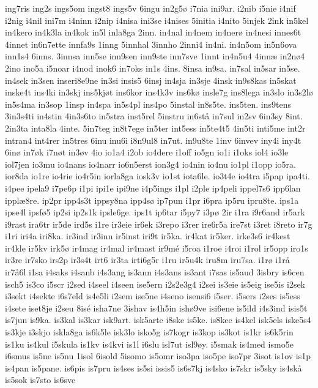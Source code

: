 {ing7ris
ing2s
ings5om
ingst8
ings5v
6ingu
in2g5ø
i7nia
ini9ar.
i2nib
i5nie
i4nif
i2nig
i4nil
ini7m
i4ninn
i2nip
i4nisa
ini3se
i4nises
5initia
i4nito
5injek
2ink
in5kel
in4kero
in4k3la
in4kok
in5l
inla8ga
2inn.
in4nal
in4nem
in4nerø
in4nesi
innes6t
4innet
in6n7ette
innfa9s
1inng
5innhal
3innho
2inni4
in4ni.
in4n5om
in5n6ova
inn1s4
6inns.
3innsa
inn5se
inn9sen
inn9ste
inn7sve
1innt
in4n5u4
4innæ
in2nø4
2ino
ino5a
i5noar
i4nod
inok6
in7oks
in1s
4ins.
8insa
in9sa.
in7sal
in5sar
in5se.
in4sek
in3sen
inseri8e9ne
in3si
insis5
6insj
in4sja
in3sje
4insk
in9s8kas
in5skat
inske4t
ins4ki
in3skj
ins5kjøt
ins6kor
ins4k3v
ins6kø
insle7g
ins8lega
in3slo
in3s2lø
in5s4ma
in3sop
1insp
in4spa
in5s4pl
ins4po
5instal
in8s5te.
ins5ten.
ins9tens
3in3s4ti
in4stin
4in3s6to
in5stra
inst5rel
5instru
in6stå
in7sul
in2sv
6in3sy
8int.
2in3ta
inta8la
4inte.
5in7teg
in8t7ege
in5ter
int5ess
in5te4t5
4in5ti
inti5me
int2r
intran4
int4rer
in5tres
6inu
inu6i
i8n9ul8
in7ut.
in9u8te
1inv
6invev
iny4i
iny4t
6inø
in7øk
i7nøt
in3øv
4io
io1a4
i2ob
io4dere
i1off
io5gn
io1i
i1oks
iol4
io3le
iol7jen
io3mu
io4nans
io4narr
io6n5erst
ion3g4
io4nin
io4nu
io1pl
i1opp
io5ra.
ior8da
io1re
io4rie
io4r5in
iorla8ga
iosk3v
io1st
iota6le.
io3t4e
io4tra
i5pap
ipa4ti.
i4pee
ipela9
i7pe6p
i1pi
ipi1e
ipi9ne
i4p5ings
i1pl
i2ple
ip4peli
ippel7s6
ipp6lan
ipplæ8re.
ip2pr
ipp4s3t
ippsy8na
ipp4sø
ip7pun
i1pr
i6pra
ip5ru
ipru8te.
ips1a
ipse4l
ipsfø5
ip2si
ip2s1k
ipsle6ge.
ips1t
ip6tar
i5py7
i3pø
2ir
i1ra
i9r6and
ir5ark
i9rast
ira6tr
ir5de
ird5s
i1re
ir3eie
ir6ek
i3repo
i3rer
ire6r5a
ire7st
i3ret
i8reto
ir7g
i1ri
iri4a
iri8ka.
ir3ind
ir3inn
ir5inst
iri9t
ir5ka.
ir4kat
ir5ker.
irke3s6
ir4kest
ir4kle
ir5kv
irk5ø
ir4mag
ir4mal
ir4mast
ir9mé
i5roa
i1roe
i4roi
i1rol
ir5opp
iro1s
ir3re
ir7sko
irs2p
ir3s4t
irt6
ir3ta
irti6g5r
i1ru
ir5u4k
iru8m
iru7sa.
i1rø
i1rå
ir7å6l
i1sa
i4saks
i4sanb
i4s3ang
is3ann
i4s3ans
is3ant
i7sas
is5aud
3isbry
is6cen
isch5
is3co
i5scr
i2sed
i4seel
i4seen
ise5ern
i2s2e3g4
i2sei
is3eie
is5eig
ise5is
i2sek
i3sekt
i4sekte
i6s7eld
is4e5li
i2sem
ise5ne
i4seno
isensi6
i5ser.
i5sers
i2ses
is5ess
i4sete
iset8je
i2seu
8isé
isha7ne
3ishav
is4h5in
ishø9ve
isi6ene
is5ild
i4s3ind
isis5t
is7jun
is9ka.
is3kal
is3kar
isk9art.
isk5arte
i8ske
is5ke.
is8kee
is4kel
isk5els
iske5s4
is3kje
i3skjo
iskla8ga
is6k5le
isk3lo
isko5g
is7kogr
is3kop
is3kot
is1kr
is6k5rin
is1ku
is4kul
i5skula
is1kv
is4kvi
is1l
i6slu
isl7ut
isl9øy.
i5smak
is4med
ismo5e
i6smus
is5ne
is5nu
1isol
6isold
5isomo
is5omr
iso3pa
iso5pe
iso7pr
3isot
is1ov
is1p
is4pan
is5pane.
is6pis
is7pru
is4ses
is5si
issis5
is6s7kj
is4sko
is7skr
is5sky
is4skå
is5sok
is7sto
is6sve
}
